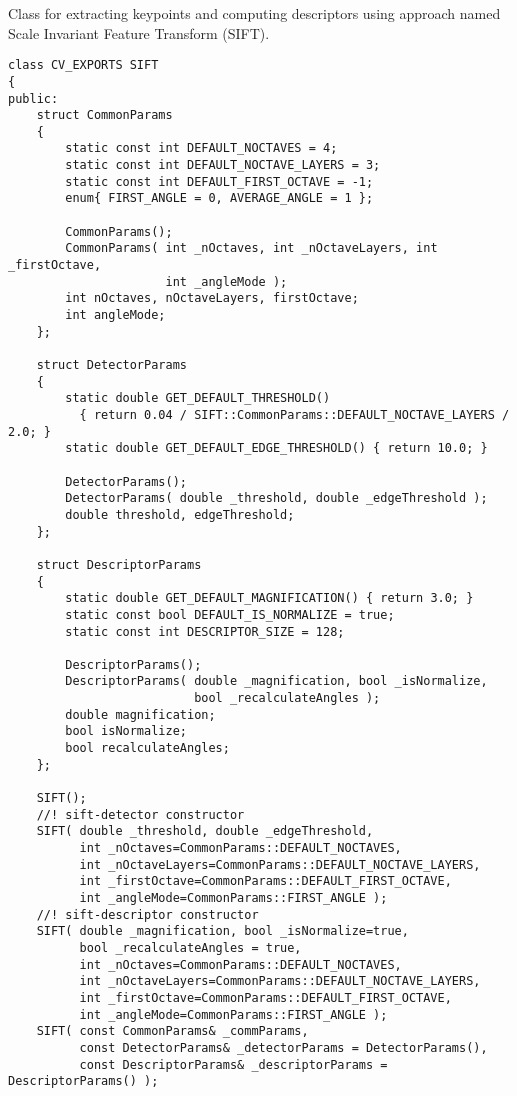 Class for extracting keypoints and computing descriptors using approach named Scale Invariant Feature Transform (SIFT).

\begin{lstlisting}
class CV_EXPORTS SIFT
{
public:
    struct CommonParams
    {
        static const int DEFAULT_NOCTAVES = 4;
        static const int DEFAULT_NOCTAVE_LAYERS = 3;
        static const int DEFAULT_FIRST_OCTAVE = -1;
        enum{ FIRST_ANGLE = 0, AVERAGE_ANGLE = 1 };

        CommonParams();
        CommonParams( int _nOctaves, int _nOctaveLayers, int _firstOctave, 
					  int _angleMode );
        int nOctaves, nOctaveLayers, firstOctave;
        int angleMode;
    };

    struct DetectorParams
    {
        static double GET_DEFAULT_THRESHOLD() 
          { return 0.04 / SIFT::CommonParams::DEFAULT_NOCTAVE_LAYERS / 2.0; }
        static double GET_DEFAULT_EDGE_THRESHOLD() { return 10.0; }

        DetectorParams();
        DetectorParams( double _threshold, double _edgeThreshold );
        double threshold, edgeThreshold;
    };

    struct DescriptorParams
    {
        static double GET_DEFAULT_MAGNIFICATION() { return 3.0; }
        static const bool DEFAULT_IS_NORMALIZE = true;
        static const int DESCRIPTOR_SIZE = 128;

        DescriptorParams();
        DescriptorParams( double _magnification, bool _isNormalize, 
						  bool _recalculateAngles );
        double magnification;
        bool isNormalize;
        bool recalculateAngles;
    };

    SIFT();
    //! sift-detector constructor
    SIFT( double _threshold, double _edgeThreshold,
          int _nOctaves=CommonParams::DEFAULT_NOCTAVES,
          int _nOctaveLayers=CommonParams::DEFAULT_NOCTAVE_LAYERS,
          int _firstOctave=CommonParams::DEFAULT_FIRST_OCTAVE,
          int _angleMode=CommonParams::FIRST_ANGLE );
    //! sift-descriptor constructor
    SIFT( double _magnification, bool _isNormalize=true,
          bool _recalculateAngles = true,
          int _nOctaves=CommonParams::DEFAULT_NOCTAVES,
          int _nOctaveLayers=CommonParams::DEFAULT_NOCTAVE_LAYERS,
          int _firstOctave=CommonParams::DEFAULT_FIRST_OCTAVE,
          int _angleMode=CommonParams::FIRST_ANGLE );
    SIFT( const CommonParams& _commParams,
          const DetectorParams& _detectorParams = DetectorParams(),
          const DescriptorParams& _descriptorParams = DescriptorParams() );


\end{lstlisting}
